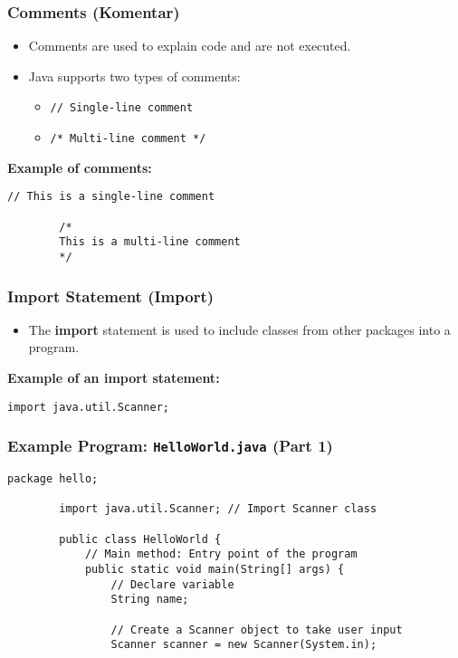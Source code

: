 \documentclass[aspectratio=169, table]{beamer}
\begin{document}
\begin{frame}[fragile]
	\frametitle{Comments (\textbf{Komentar})}
	
	\begin{itemize}
		\item Comments are used to explain code and are not executed.
		\item Java supports two types of comments:
		\begin{itemize}
			\item \texttt{// Single-line comment}
			\item \texttt{/* Multi-line comment */}
		\end{itemize}
	\end{itemize}
	
	\textbf{Example of comments:}
	
	\begin{lstlisting}[style=JavaStyle]
		// This is a single-line comment
		
		/*
		This is a multi-line comment
		*/
	\end{lstlisting}
\end{frame}

\begin{frame}[fragile]
	\frametitle{Import Statement (\textbf{Import})}
	
	\begin{itemize}
		\item The \textbf{import} statement is used to include classes from other packages into a program.
	\end{itemize}
	
	\textbf{Example of an import statement:}
	
	\begin{lstlisting}[style=JavaStyle]
		import java.util.Scanner;
	\end{lstlisting}
\end{frame}


\begin{frame}[fragile]
	\frametitle{Example Program: \texttt{HelloWorld.java} (Part 1)}
	
	\begin{lstlisting}[style=JavaStyle, caption={Example Program: HelloWorld.java (Part 1)}]
		package hello;
		
		import java.util.Scanner; // Import Scanner class
		
		public class HelloWorld {
			// Main method: Entry point of the program
			public static void main(String[] args) {
				// Declare variable
				String name;
				
				// Create a Scanner object to take user input
				Scanner scanner = new Scanner(System.in);
			\end{lstlisting}
		\end{frame}
		
\end{document}
